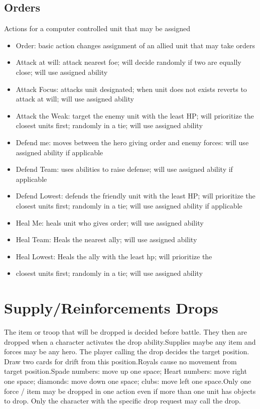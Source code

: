 \subsection{Orders}
Actions for a computer controlled unit that may be assigned
\begin{itemize}
\item Order: basic action changes assignment of an allied unit that may take orders
\item Attack at will: attack nearest foe; will decide randomly if two are equally close; will use assigned ability
\item Attack Focus: attacks unit designated; when unit does not exists reverts to attack at will; will use assigned ability
\item Attack the Weak: target the enemy unit with the least HP; will prioritize the closest units first; randomly in a tie; will use assigned ability
\item Defend me: moves between the hero giving order and enemy forces: will use assigned ability if applicable
\item Defend Team: uses abilities to raise defense; will use assigned ability if applicable
\item Defend Lowest:  defends the friendly unit with the least HP; will prioritize the closest units first; randomly in a tie; will use assigned ability if applicable
\item Heal Me: heals unit who gives order; will use assigned ability 
\item Heal Team: Heals the nearest ally; will use assigned ability
\item Heal Lowest: Heals the ally with the least hp; will prioritize the \item closest units first; randomly in a tie; will use assigned ability
\end{itemize}

\section{Supply/Reinforcements Drops}
The item or troop that will be dropped is decided before battle.  They then are dropped when a character activates the drop ability.Supplies maybe any item and forces may be any hero.  The player calling the drop decides the target position.  Draw two cards for drift from this position.Royals cause no movement from target position.Spade numbers: move up one space; Heart numbers: move right one space; diamonds: move down one space; clubs: move left one space.Only one force
/ item may be dropped in one action even if more than one unit has objects to drop.  Only the character with the specific drop request may call the drop.

